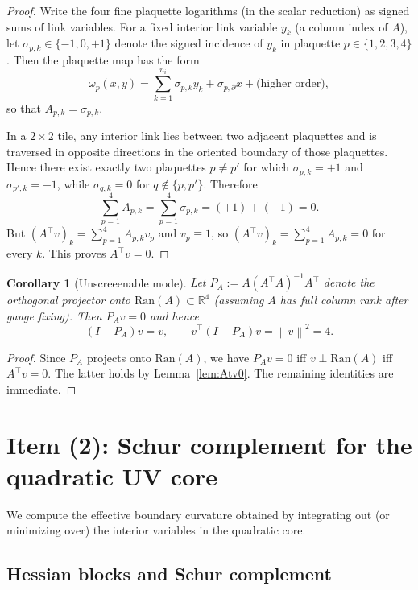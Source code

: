 \documentclass[11pt]{article}
\newtheorem{corollary}[theorem]{Corollary}
\theoremstyle{definition}
\newcommand{\1}{\mathbf{1}}
\newcommand{\R}{\mathbb{R}}
\newcommand{\norm}[1]{\left\lVert#1\right\rVert}
\begin{document}
\begin{proof}
Write the four fine plaquette logarithms (in the scalar reduction) as signed sums of link variables. For a fixed interior link variable $y_k$ (a column index of $A$), let $\sigma_{p,k}\in\{-1,0,+1\}$ denote the signed incidence of $y_k$ in plaquette $p\in\{1,2,3,4\}$. Then the plaquette map has the form
\[
\omega_p(x,y)=\sum_{k=1}^{n_i} \sigma_{p,k} y_k + \sigma_{p,\partial} x + \text{(higher order)},
\]
so that $A_{p,k}=\sigma_{p,k}$.

In a $2\times2$ tile, any interior link lies between two adjacent plaquettes and is traversed in opposite directions in the oriented boundary of those plaquettes. Hence there exist exactly two plaquettes $p\neq p'$ for which $\sigma_{p,k}=+1$ and $\sigma_{p',k}=-1$, while $\sigma_{q,k}=0$ for $q\notin\{p,p'\}$. Therefore
\[
\sum_{p=1}^4 A_{p,k} = \sum_{p=1}^4 \sigma_{p,k}= (+1)+(-1)=0.
\]
But $(A^\top v)_k=\sum_{p=1}^4 A_{p,k} v_p$ and $v_p\equiv 1$, so $(A^\top v)_k=\sum_{p=1}^4 A_{p,k}=0$ for every $k$. This proves $A^\top v=0$.
\end{proof}

\begin{corollary}[Unscreeenable mode]\label{cor:unscreen}
Let $P_A:=A(A^\top A)^{-1}A^\top$ denote the orthogonal projector onto $\mathrm{Ran}(A)\subset\R^4$ (assuming $A$ has full column rank after gauge fixing). Then $P_A v=0$ and hence
\[
(I-P_A)v=v,\qquad v^\top (I-P_A) v=\norm{v}^2=4.
\]
\end{corollary}

\begin{proof}
Since $P_A$ projects onto $\mathrm{Ran}(A)$, we have $P_A v=0$ iff $v\perp \mathrm{Ran}(A)$ iff $A^\top v=0$. The latter holds by Lemma~\ref{lem:Atv0}. The remaining identities are immediate.
\end{proof}

\section{Item (2): Schur complement for the quadratic UV core}

We compute the effective boundary curvature obtained by integrating out (or minimizing over) the interior variables in the quadratic core.

\subsection{Hessian blocks and Schur complement}
\end{document}
